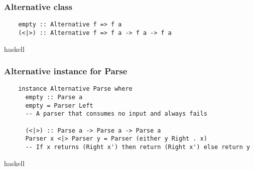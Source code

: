 \documentclass{beamer}
\begin{document}
\begin{frame}
  \frametitle{Alternative class}

  \begin{verbatim}
    empty :: Alternative f => f a
    (<|>) :: Alternative f => f a -> f a -> f a
  \end{verbatim}{haskell}

\end{frame}


\begin{frame}
  \frametitle{Alternative instance for Parse}

  \begin{verbatim}
    instance Alternative Parse where
      empty :: Parse a
      empty = Parser Left
      -- A parser that consumes no input and always fails

      (<|>) :: Parse a -> Parse a -> Parse a
      Parser x <|> Parser y = Parser (either y Right . x)
      -- If x returns (Right x') then return (Right x') else return y
  \end{verbatim}{haskell}



\end{frame}



\end{document}
